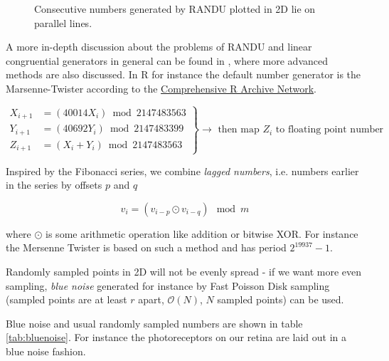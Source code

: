 \begin{figure}[H]
    \centering
    
    \caption{Consecutive numbers generated by RANDU plotted in 2D lie on parallel lines.}
    \label{fig:randu}
\end{figure}

A more in-depth discussion about the problems of RANDU and linear congruential
generators in general can be found in \cite[chapter 7]{press07}, where more advanced 
methods are also discussed. In R for instance the default number generator is the 
Marsenne-Twister \citep{matsumoto98} according to the 
\href{https://cran.r-project.org/web/views/Distributions.html}{Comprehensive R Archive Network}.

\begin{equation}
    \left.\begin{array}{rl}
    X_{i+1} & =\left(40014 X_i\right) \bmod 2147483563 \\
    Y_{i+1} & =\left(40692 Y_i\right) \bmod 2147483399 \\
    Z_{i+1} & =\left(X_i+Y_i\right) \bmod 2147483563
    \end{array}\right\} \rightarrow \text { then map } Z_i \text { to floating point number }
\end{equation}

Inspired by the Fibonacci series, we combine \textit{lagged numbers}, i.e. numbers
earlier in the series by offsets $p$ and $q$

\begin{equation}
    v_i = (v_{i-p} \odot v_{i-q}) \mod m
\end{equation}

where $\odot$ is some arithmetic operation like addition or bitwise XOR.
For instance the Mersenne Twister is based on such
a method and has period $2^{19937} - 1$.

Randomly sampled points in 2D will not be evenly spread - 
if we want more even sampling, \textit{blue noise}
generated for instance by Fast Poisson Disk sampling 
(sampled points are at least $r$ apart, $\mathcal{O}(N)$, $N$ sampled points) can be used.

Blue noise and usual randomly sampled numbers 
are shown in table \ref{tab:bluenoise}. For 
instance the photoreceptors on our retina are
laid out in a blue noise fashion.

